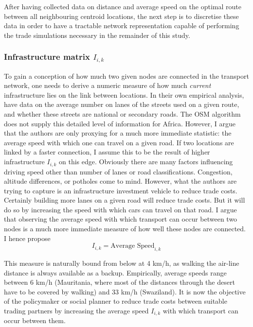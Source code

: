 \documentclass[11pt, oneside]{article}   	%
\begin{document}
After having collected data on distance and average speed on the optimal route between all neighbouring centroid locations, the next step is to discretise these data in order to have a tractable network representation capable of performing the trade simulations necessary in the remainder of this study.

\subsubsection{Infrastructure matrix $I_{i,k}$}
To gain a conception of how much two given nodes are connected in the transport network, one needs to derive a numeric measure of how much \emph{current} infrastructure lies on the link between locations. In their own empirical analysis, \cite{fajgelbaum_optimal_2017} have data on the average number on lanes of the streets used on a given route, and whether these streets are national or secondary roads. The OSM algorithm does not supply this detailed level of information for Africa. However, I argue that the authors are only proxying for a much more immediate statistic: the average speed with which one can travel on a given road. If two locations are linked by a faster connection, I assume this to be the result of higher infrastructure $I_{i,k}$ on this edge. Obviously there are many factors influencing driving speed other than number of lanes or road classifications. Congestion, altitude differences, or potholes come to mind. However, what the authors are trying to capture is an infrastructure investment vehicle to reduce trade costs. Certainly building more lanes on a given road will reduce trade costs. But it will do so by increasing the speed with which cars can travel on that road. I argue that observing the average speed with which transport can occur between two nodes is a much more immediate measure of how well these nodes are connected. I hence propose
\begin{equation}
  I_{i,k} = \textrm{Average Speed}_{i,k}
\end{equation}

This measure is naturally bound from below at 4 km/h, as walking the air-line distance is always available as a backup. Empirically, average speeds range between 6 km/h (Mauritania, where most of the distances through the desert have to be covered by walking) and 33 km/h (Swaziland). It is now the objective of the policymaker or social planner to reduce trade costs between suitable trading partners by increasing the average speed $I_{i,k}$ with which transport can occur between them.
\end{document}

